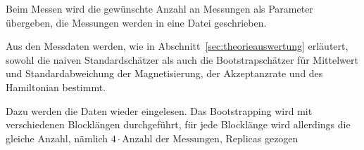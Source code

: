 	Beim Messen wird die gewünschte Anzahl an Messungen als Parameter übergeben, die Messungen werden in eine Datei geschrieben.
	
	Aus den Messdaten werden, wie in Abschnitt~\ref{sec:theorieauswertung} erläutert, sowohl die naiven Standardschätzer als auch die Bootstrapschätzer für Mittelwert und Standardabweichung der Magnetisierung, der Akzeptanzrate und des Hamiltonian bestimmt.
	
	Dazu werden die Daten wieder eingelesen. Das Bootstrapping wird mit verschiedenen Blocklängen durchgeführt, für jede Blocklänge wird allerdings die gleiche Anzahl, nämlich $4\cdot\text{Anzahl der Messungen}$, Replicas gezogen
	
	
	
	
	
	
	
